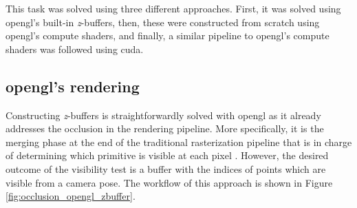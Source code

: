 This task was solved using three different approaches. First, it was solved using \acrshort{opengl}'s built-in \textit{z}-buffers, then, these were constructed from scratch using \acrshort{opengl}'s compute shaders, and finally, a similar pipeline to \acrshort{opengl}'s compute shaders was followed using \acrshort{cuda}.

\newcommand{\Points}{\textrm{P}\textsubscript{\acrshort{gpu}}}
\newcommand{\Viewpoints}{\textrm{V}\textsubscript{\acrshort{cpu}}}
\newcommand{\Space}{\hspace{1mm}}
\newcommand{\Zbuffer}{z\textrm{-buffer}\textsubscript{GPU}}
\newcommand{\ZbufferCPU}{z\textrm{-buffer}\textsubscript{CPU}}
\newcommand{\Indices}{\textrm{indices}\textsubscript{\acrshort{gpu}}}
\newcommand{\Codes}{\textrm{codes}\textsubscript{\acrshort{gpu}}}
\newcommand{\PCCardinality}{|\Points|}
\newcommand{\LeftPoints}{\textrm{n}_\textsubscript{left}}
\newcommand{\CurrentPoints}{\textrm{n}_\textsubscript{current}}
\newcommand{\MaxPoints}{\textrm{n}_\textsubscript{max}}
\newcommand{\NumGroups}{\textrm{n}_\textsubscript{groups}}
\newcommand{\Pointa}{\textrm{p}\textsubscript{3D}}
\newcommand{\Pointb}{\textrm{p}\textsubscript{2D}}

\subsection{\acrshort{opengl}'s rendering}

Constructing \textit{z}-buffers is straightforwardly solved with \acrshort{opengl} as it already addresses the occlusion in the rendering pipeline. More specifically, it is the merging phase at the end of the traditional rasterization pipeline that is in charge of determining which primitive is visible at each pixel \cite{akenine-moller_real-time_2018}. However, the desired outcome of the visibility test is a buffer with the indices of points which are visible from a camera pose. The workflow of this approach is shown in Figure \ref{fig:occlusion_opengl_zbuffer}.

